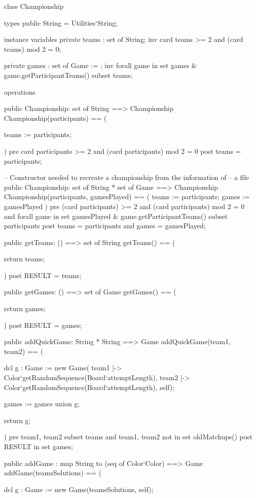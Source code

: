 \begin{vdm_al}
class Championship

 types
  public String = Utilities`String;

 instance variables
  private teams : set of String;
  inv card teams >= 2 and (card teams) mod 2 = 0;

  private games : set of Game := {};
  inv forall game in set games & game.getParticipantTeams() subset teams;


 operations

  public Championship: set of String ==> Championship
  Championship(participants) == (

   teams := participants;

  )
  pre card participants >= 2 and (card participants) mod 2 = 0
  post teams = participants;


  -- Constructor needed to recreate a championship from the information of
  -- a file
  public Championship: set of String * set of Game ==> Championship
  Championship(participants, gamesPlayed) == (
   teams := participants;
   games := gamesPlayed
  )
  pre (card participants) >= 2 and (card participants) mod 2 = 0 and
   forall game in set gamesPlayed & game.getParticipantTeams() subset participants
  post teams = participants and games = gamesPlayed;


  public getTeams: () ==> set of String
  getTeams() == (

   return teams;

  )
  post RESULT = teams;


  public getGames: () ==> set of Game
  getGames() == (

   return games;

  )
  post RESULT = games;


  public addQuickGame: String * String ==> Game
  addQuickGame(team1, team2) == (

   dcl g : Game := new Game(
    {team1 |-> Color`getRandomSequence(Board`attemptLength),
     team2 |-> Color`getRandomSequence(Board`attemptLength)},
    self);

   games := games union {g};

   return g;

  )
  pre {team1, team2} subset teams and
   {team1, team2} not in set oldMatchups()
  post RESULT in set games;


  public addGame : map String to (seq of Color`Color) ==> Game
  addGame(teamsSolutions) == (

   dcl g : Game := new Game(teamsSolutions, self);


\end{vdm_al}

